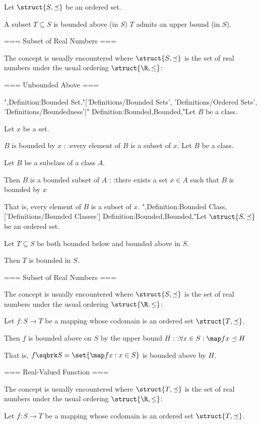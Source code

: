 Let $\struct {S, \preceq}$ be an ordered set.


A subset $T \subseteq S$ is bounded above (in $S$)  $T$ admits an upper bound (in $S$).


=== Subset of Real Numbers ===

The concept is usually encountered where $\struct {S, \preceq}$ is the set of real numbers under the usual ordering $\struct {\R, \le}$:



=== Unbounded Above ===

",Definition:Bounded Set,"['Definitions/Bounded Sets', 'Definitions/Ordered Sets', 'Definitions/Boundedness']"
Definition:Bounded,Bounded,"Let $B$ be a class.

Let $x$ be a set.

$B$ is bounded by $x$ :
:every element of $B$ is a subset of $x$.
Let $B$ be a class.

Let $B$ be a subclass of a class $A$.

Then $B$ is a bounded subset of $A$ :
:there exists a set $x \in A$ such that $B$ is bounded by $x$ 


That is,  every element of $B$ is a subset of $x$.
",Definition:Bounded Class,['Definitions/Bounded Classes']
Definition:Bounded,Bounded,"Let $\struct {S, \preceq}$ be an ordered set.

Let $T \subseteq S$ be both bounded below and bounded above in $S$.


Then $T$ is bounded in $S$.


=== Subset of Real Numbers ===

The concept is usually encountered where $\struct {S, \preceq}$ is the set of real numbers under the usual ordering $\struct {\R, \le}$:


Let $f: S \to T$ be a mapping whose codomain is an ordered set $\struct {T, \preceq}$.


Then $f$ is bounded above on $S$ by the upper bound $H$ :
:$\forall x \in S: \map f x \preceq H$


That is,  $f \sqbrk S = \set {\map f x: x \in S}$ is bounded above by $H$.


=== Real-Valued Function ===

The concept is usually encountered where $\struct {T, \preceq}$ is the set of real numbers under the usual ordering $\struct {\R, \le}$:


Let $f: S \to T$ be a mapping whose codomain is an ordered set $\struct {T, \preceq}$.


